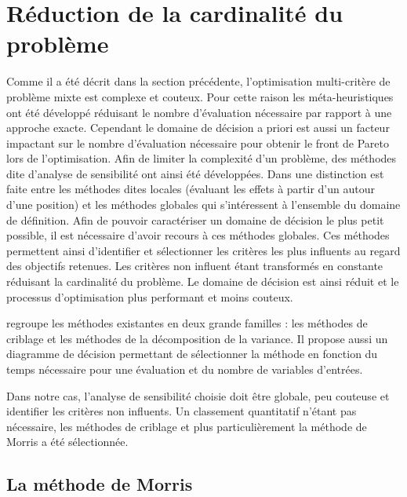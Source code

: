 \section{Réduction de la cardinalité du problème} %
\label{sec:reduction_de_la_cardinalite_du_probleme}

Comme il a été décrit dans la section précédente, l’optimisation multi-critère de
problème mixte est complexe et couteux. Pour cette raison les méta-heuristiques
ont été développé réduisant le nombre d’évaluation nécessaire par rapport à une
approche exacte.
Cependant le domaine de décision a priori est aussi un facteur impactant sur le
nombre d’évaluation nécessaire pour obtenir le front de Pareto lors de l’optimisation.
Afin de limiter la complexité d’un problème, des méthodes dite d’analyse de sensibilité
ont ainsi été développées.
Dans \cite{Iooss2011} une distinction est faite entre les méthodes dites locales
(évaluant les effets à partir d’un autour d’une position) et les méthodes globales qui
s’intéressent à l’ensemble du domaine de définition. Afin de pouvoir caractériser
un domaine de décision le plus petit possible, il est nécessaire d’avoir recours à
ces méthodes globales.
Ces méthodes permettent ainsi d’identifier et sélectionner les critères les plus influents
au regard des objectifs retenues. Les critères non influent étant transformés en
constante réduisant la cardinalité du problème. Le domaine de décision est ainsi
réduit et le processus d’optimisation plus performant et moins couteux.

\cite{Iooss2011} regroupe les méthodes existantes en deux grande familles : les
méthodes de criblage et les méthodes de la décomposition de la variance. Il propose
aussi un diagramme de décision permettant de sélectionner la méthode en fonction
du temps nécessaire pour une évaluation et du nombre de variables d’entrées.

Dans notre cas, l’analyse de sensibilité choisie doit être globale, peu couteuse
et identifier les critères non influents. Un classement quantitatif n’étant pas
nécessaire, les méthodes de criblage et plus particulièrement la méthode de Morris
a été sélectionnée.



\subsection{La méthode de Morris} %
\label{sub:la_methode_de_morris}

